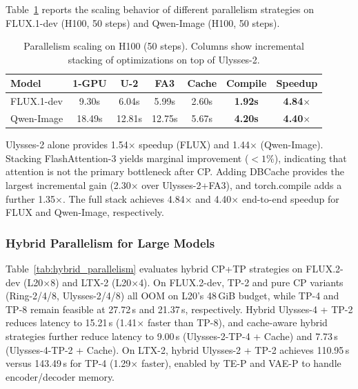 \documentclass[10pt]{article}
\begin{document}
Table~\ref{tab:parallel_scaling} reports the scaling behavior of different parallelism strategies on FLUX.1-dev (H100, 50 steps) and Qwen-Image (H100, 50 steps).

\begin{table}[htbp]
\centering
\caption{Parallelism scaling on H100 (50 steps). Columns show incremental stacking of optimizations on top of Ulysses-2.}
\label{tab:parallel_scaling}
{\small
\begin{tabular}{lcccccc}
\toprule
\textbf{Model} & \textbf{1-GPU} & \textbf{U-2} & \textbf{FA3} & \textbf{Cache} & \textbf{Compile} & \textbf{Speedup}\\
\midrule
FLUX.1-dev & 9.30s & 6.04s & 5.99s & 2.60s & \textbf{1.92s} & \textbf{4.84$\times$} \\
Qwen-Image & 18.49s & 12.81s & 12.75s & 5.67s & \textbf{4.20s} & \textbf{4.40$\times$} \\
\bottomrule
\end{tabular}
}
\end{table}

Ulysses-2 alone provides 1.54$\times$ speedup (FLUX) and 1.44$\times$ (Qwen-Image). Stacking FlashAttention-3 yields marginal improvement ({$<1\%$}), indicating that attention is not the primary bottleneck after CP. Adding DBCache provides the largest incremental gain (2.30$\times$ over Ulysses-2+FA3), and torch.compile adds a further 1.35$\times$. The full stack achieves 4.84$\times$ and 4.40$\times$ end-to-end speedup for FLUX and Qwen-Image, respectively.

\subsubsection{Hybrid Parallelism for Large Models}

Table~\ref{tab:hybrid_parallelism} evaluates hybrid CP+TP strategies on FLUX.2-dev (L20$\times$8) and LTX-2 (L20$\times$4). On FLUX.2-dev, TP-2 and pure CP variants (Ring-2/4/8, Ulysses-2/4/8) all OOM on L20's 48\,GiB budget, while TP-4 and TP-8 remain feasible at 27.72\,s and 21.37\,s, respectively. Hybrid Ulysses-4 + TP-2 reduces latency to 15.21\,s (1.41$\times$ faster than TP-8), and cache-aware hybrid strategies further reduce latency to 9.00\,s (Ulysses-2-TP-4 + Cache) and 7.73\,s (Ulysses-4-TP-2 + Cache). On LTX-2, hybrid Ulysses-2 + TP-2 achieves 110.95\,s versus 143.49\,s for TP-4 (1.29$\times$ faster), enabled by TE-P and VAE-P to handle encoder/decoder memory.
\end{document}
